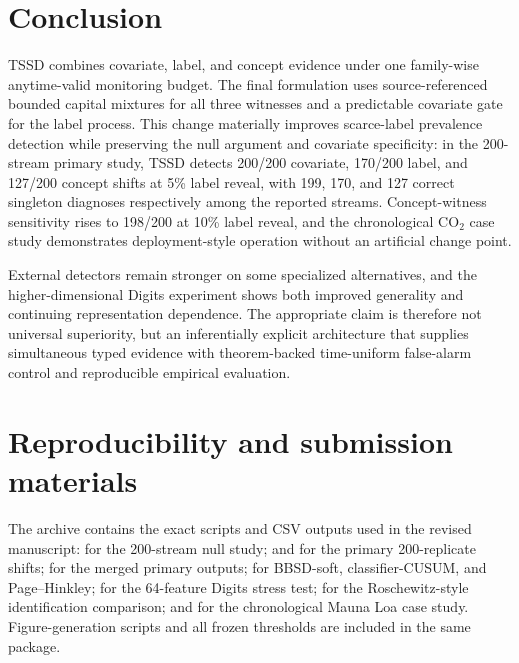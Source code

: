 \documentclass[11pt,a4paper]{article}
\theoremstyle{definition}
\newcommand{\1}{\mathbf{1}}
\begin{document}
\section{Conclusion}
\label{sec:conclusion}

TSSD combines covariate, label, and concept evidence under one family-wise anytime-valid monitoring budget. The final formulation uses source-referenced bounded capital mixtures for all three witnesses and a predictable covariate gate for the label process. This change materially improves scarce-label prevalence detection while preserving the null argument and covariate specificity: in the 200-stream primary study, TSSD detects 200/200 covariate, 170/200 label, and 127/200 concept shifts at 5\% label reveal, with 199, 170, and 127 correct singleton diagnoses respectively among the reported streams. Concept-witness sensitivity rises to 198/200 at 10\% label reveal, and the chronological CO$_2$ case study demonstrates deployment-style operation without an artificial change point.

External detectors remain stronger on some specialized alternatives, and the higher-dimensional Digits experiment shows both improved generality and continuing representation dependence. The appropriate claim is therefore not universal superiority, but an inferentially explicit architecture that supplies simultaneous typed evidence with theorem-backed time-uniform false-alarm control and reproducible empirical evaluation.

\appendix
\section{Reproducibility and submission materials}
\label{sec:files}

The archive contains the exact scripts and CSV outputs used in the revised manuscript:  for the 200-stream null study;  and  for the primary 200-replicate shifts;  for the merged primary outputs;  for BBSD-soft, classifier-CUSUM, and Page--Hinkley;  for the 64-feature Digits stress test;  for the Roschewitz-style identification comparison; and  for the chronological Mauna Loa case study. Figure-generation scripts and all frozen thresholds are included in the same package.
\end{document}
